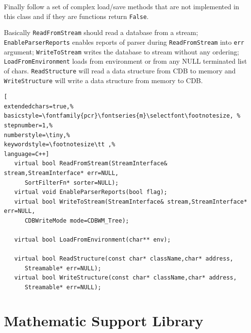 Finally follow a set of complex load/save methods that are not implemented in this class and if they are functions return \texttt{False}.

Basically \texttt{ReadFromStream} should read a database from a stream; \texttt{EnableParserReports} enables reports of parser during \texttt{ReadFromStream} into \texttt{err} argument; \texttt{WriteToStream} writes the database to stream without any ordering; \texttt{LoadFromEnvironment} loads from environment or from any NULL terminated list of chars. \texttt{ReadStructure} will read a data structure from CDB to memory and \texttt{WriteStructure} will write a data structure from memory to CDB.

\begin{lstlisting}[
extendedchars=true,%
basicstyle=\fontfamily{pcr}\fontseries{m}\selectfont\footnotesize, %
stepnumber=1,%
numberstyle=\tiny,%
keywordstyle=\footnotesize\tt ,%
language=C++]
   virtual bool ReadFromStream(StreamInterface& stream,StreamInterface* err=NULL,
      SortFilterFn* sorter=NULL);
   virtual void EnableParserReports(bool flag);
   virtual bool WriteToStream(StreamInterface& stream,StreamInterface* err=NULL,
      CDBWriteMode mode=CDBWM_Tree);

   virtual bool LoadFromEnvironment(char** env);

   virtual bool ReadStructure(const char* className,char* address,
      Streamable* err=NULL);
   virtual bool WriteStructure(const char* className,char* address,
      Streamable* err=NULL);
\end{lstlisting}



\section{Mathematic Support Library}

